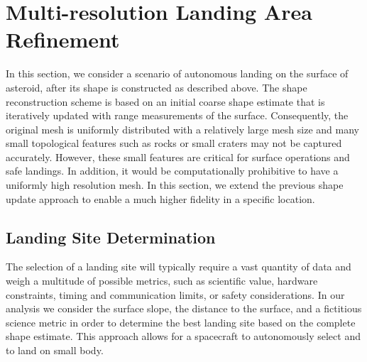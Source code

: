 \documentclass[smallextended]{svjour3}       %
\begin{document}
\section{Multi-resolution Landing Area Refinement}\label{sec:landing_refinement}

In this section, we consider a scenario of autonomous landing on the surface of asteroid, after its shape is constructed as described above.
The shape reconstruction scheme is based on an initial coarse shape estimate that is iteratively updated with range measurements of the surface.
Consequently, the original mesh is uniformly distributed with a relatively large mesh size and many small topological features such as rocks or small craters may not be captured accurately.
However, these small features are critical for surface operations and safe landings.
In addition, it would be computationally prohibitive to have a uniformly high resolution mesh.
In this section, we extend the previous shape update approach to enable a much higher fidelity in a specific location.

\subsection{Landing Site Determination}

The selection of a landing site will typically require a vast quantity of data and weigh a multitude of possible metrics, such as scientific value, hardware constraints, timing and communication limits, or safety considerations. 
In our analysis we consider the surface slope, the distance to the surface, and a fictitious science metric in order to determine the best landing site based on the complete shape estimate.
This approach allows for a spacecraft to autonomously select and to land on small body.
\end{document}
